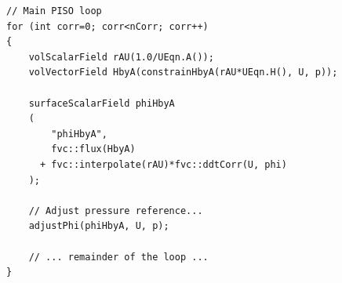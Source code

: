 \begin{lstlisting}[caption={A longer OpenFOAM implementation that can safely break across pages.}, label={lst:piso_loop}]
// Main PISO loop
for (int corr=0; corr<nCorr; corr++)
{
    volScalarField rAU(1.0/UEqn.A());
    volVectorField HbyA(constrainHbyA(rAU*UEqn.H(), U, p));

    surfaceScalarField phiHbyA
    (
        "phiHbyA",
        fvc::flux(HbyA)
      + fvc::interpolate(rAU)*fvc::ddtCorr(U, phi)
    );

    // Adjust pressure reference...
    adjustPhi(phiHbyA, U, p);

    // ... remainder of the loop ...
}
\end{lstlisting}
